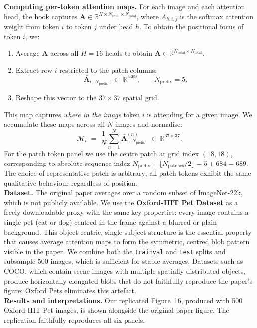 \documentclass[12pt]{article}
\begin{document}
\textbf{Computing per-token attention maps.} For each image and each attention head, the hook captures $\mathbf{A} \in \mathbb{R}^{H \times N_{\mathrm{total}} \times N_{\mathrm{total}}}$, where $A_{h,i,j}$ is the softmax attention weight from token $i$ to token $j$ under head $h$. To obtain the positional focus of token $i$, we:
\begin{enumerate}
    \item Average $\mathbf{A}$ across all $H = 16$ heads to obtain $\bar{\mathbf{A}} \in \mathbb{R}^{N_{\mathrm{total}} \times N_{\mathrm{total}}}$.
    \item Extract row $i$ restricted to the patch columns:
    \[
        \bar{\mathbf{A}}_{i,\; N_{\mathrm{prefix}}:} \;\in\; \mathbb{R}^{1369}, \qquad N_{\mathrm{prefix}} = 5.
    \]
    \item Reshape this vector to the $37 \times 37$ spatial grid.
\end{enumerate}
This map captures \textit{where in the image} token $i$ is attending for a given image. We accumulate these maps across all $N$ images and normalise:
\[
    \mathcal{M}_i \;=\; \frac{1}{N} \sum_{n=1}^{N} \bar{\mathbf{A}}^{(n)}_{i,\; N_{\mathrm{prefix}}:}
    \;\in\; \mathbb{R}^{37 \times 37}.
\]
For the patch token panel we use the centre patch at grid index $(18, 18)$, corresponding to absolute sequence index $N_{\mathrm{prefix}} + \lfloor N_{\mathrm{patches}} / 2 \rfloor = 5 + 684 = 689$. The choice of representative patch is arbitrary; all patch tokens exhibit the same qualitative behaviour regardless of position.\\
\textbf{Dataset.} The original paper averages over a random subset of ImageNet-22k, which is not publicly available. We use the \textbf{Oxford-IIIT Pet Dataset} as a freely downloadable proxy with the same key properties: every image contains a single pet (cat or dog) centred in the frame against a blurred or plain background. This object-centric, single-subject structure is the essential property that causes average attention maps to form the symmetric, centred blob pattern visible in the paper. We combine both the \texttt{trainval} and \texttt{test} splits and subsample 500 images, which is sufficient for stable averages. Datasets such as COCO, which contain scene images with multiple spatially distributed objects, produce horizontally elongated blobs that do not faithfully reproduce the paper's figure; Oxford Pets eliminates this artefact.\\
\textbf{Results and interpretations.} 
Our replicated Figure~16, produced with 500 Oxford-IIIT Pet images, is shown alongside the original paper figure. The replication faithfully reproduces all six panels.
\end{document}
